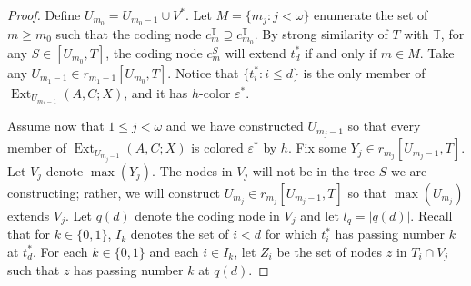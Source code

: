 \documentclass{amsart}
\theoremstyle{remark}
\theoremstyle{definition}
\theoremstyle{remark}
\newcommand{\om}{\omega}
\newcommand{\contains}{\supseteq}
\DeclareMathOperator{\Ext}{Ext}
\newcommand{\bT}{\mathbb{T}}
\begin{document}
\begin{proof}
Define $U_{m_0}=U_{m_0-1}\cup V^*$.
Let $M=\{m_j:j<\om\}$ enumerate  the set of $m\ge m_0$
such that the coding node $c^{\bT}_{m}\contains c^{\bT}_{m_0}$.
By strong similarity of $T$ with $\bT$, for any $S\in[U_{m_0}, T]$,
the  coding node $c^S_m$ will  extend $t^*_d$ if and only if $m\in M$.
Take any $U_{m_1-1}\in r_{m_1-1}[U_{m_0},T]$.
Notice that $\{t^*_i:i\le d\}$ is the only member of $\Ext_{U_{m_1-1}}(A,C;X)$,
and it has $h$-color $\varepsilon^*$.



Assume  now that  $1\le j<\om$ and
 we have constructed $U_{m_j-1}$ so that every member of $\Ext_{U_{m_j-1}}(A,C;X)$ is colored $\varepsilon^*$ by $h$.
Fix some  $Y_j\in r_{m_j}[U_{m_j-1} ,T]$.
Let $V_j$ denote $\max(Y_j)$.
The nodes in $V_j$ will not be in the tree $S$ we are constructing;
rather,
we will construct
$U_{m_j}\in r_{m_j}[U_{m_j-1},T]$
so that
$\max(U_{m_j})$ extends
 $V_j$.
Let $q(d)$ denote the coding   node in $V_j$ and let $l_q=|q(d)|$.
Recall that for $k\in\{0,1\}$, $I_k$ denotes the set of
 $i<d$ for which $t^*_i$ has passing number $k$ at $t^*_d$.
For each $k\in\{0,1\}$ and
each
$i\in I_k$, let
$Z_i$ be the set
of nodes $z$ in $T_i\cap V_j$ such that $z$ has passing number $k$ at  $q(d)$.




\end{proof}
\end{document}
